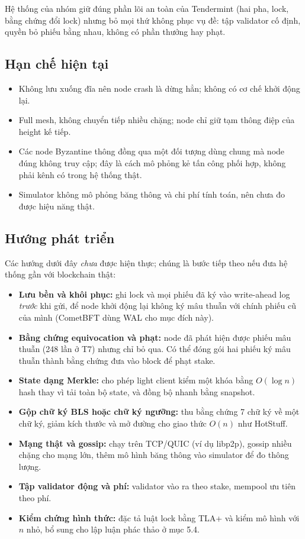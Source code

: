 \documentclass[a4paper,12pt]{article}
\newcommand{\code}[1]{\texttt{\detokenize{#1}}}
\begin{document}
Hệ thống của nhóm giữ đúng phần lõi an toàn của Tendermint (hai pha, lock, bằng chứng đổi lock) nhưng bỏ
mọi thứ không phục vụ đề: tập validator cố định, quyền bỏ phiếu bằng nhau, không có phần thưởng hay phạt.

\subsection{Hạn chế hiện tại}
\begin{itemize}
\item Không lưu xuống đĩa nên node crash là dừng hẳn; không có cơ chế khởi động lại.
\item Full mesh, không chuyển tiếp nhiều chặng; node chỉ giữ tạm thông điệp của height kế tiếp.
\item Các node Byzantine thông đồng qua một đối tượng dùng chung mà node đúng không truy cập; đây là cách
mô phỏng kẻ tấn công phối hợp, không phải kênh có trong hệ thống thật.
\item Simulator không mô phỏng băng thông và chi phí tính toán, nên chưa đo được hiệu năng thật.
\end{itemize}

\subsection{Hướng phát triển}
Các hướng dưới đây \emph{chưa} được hiện thực; chúng là bước tiếp theo nếu đưa hệ thống gần với blockchain thật:
\begin{itemize}
\item \textbf{Lưu bền và khôi phục:} ghi lock và mọi phiếu đã ký vào write-ahead log \emph{trước} khi gửi, để
node khởi động lại không ký mâu thuẫn với chính phiếu cũ của mình (CometBFT dùng WAL cho mục đích này).
\item \textbf{Bằng chứng equivocation và phạt:} node đã phát hiện được phiếu mâu thuẫn (248 lần ở T7) nhưng
chỉ bỏ qua. Có thể đóng gói hai phiếu ký mâu thuẫn thành bằng chứng đưa vào block để phạt stake.
\item \textbf{State dạng Merkle:} cho phép light client kiểm một khóa bằng $O(\log n)$ hash thay vì tải toàn
bộ state, và đồng bộ nhanh bằng snapshot.
\item \textbf{Gộp chữ ký BLS hoặc chữ ký ngưỡng:} thu bằng chứng 7 chữ ký về một chữ ký, giảm kích thước
\code{COMMIT} và mở đường cho giao thức $O(n)$ như HotStuff.
\item \textbf{Mạng thật và gossip:} chạy trên TCP/QUIC (ví dụ libp2p), gossip nhiều chặng cho mạng lớn, thêm
mô hình băng thông vào simulator để đo thông lượng.
\item \textbf{Tập validator động và phí:} validator vào ra theo stake, mempool ưu tiên theo phí.
\item \textbf{Kiểm chứng hình thức:} đặc tả luật lock bằng TLA+ và kiểm mô hình với $n$ nhỏ, bổ sung cho lập
luận phác thảo ở mục 5.4.
\end{itemize}
\end{document}
